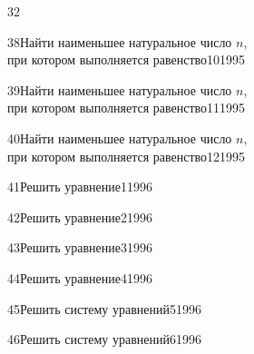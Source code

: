 \begin{TrigSourcePage}{32}
\begin{TrigExercise}{38}{Найти наименьшее натуральное число $n$,\\при котором выполняется равенство}{10}{1995}
\end{TrigExercise}
\begin{TrigExercise}{39}{Найти наименьшее натуральное число $n$,\\при котором выполняется равенство}{11}{1995}
\end{TrigExercise}
\begin{TrigExercise}{40}{Найти наименьшее натуральное число $n$,\\при котором выполняется равенство}{12}{1995}
\end{TrigExercise}
\begin{TrigExercise}{41}{Решить уравнение}{1}{1996}
\end{TrigExercise}
\begin{TrigExercise}{42}{Решить уравнение}{2}{1996}
\end{TrigExercise}
\begin{TrigExercise}{43}{Решить уравнение}{3}{1996}
\end{TrigExercise}
\begin{TrigExercise}{44}{Решить уравнение}{4}{1996}
\end{TrigExercise}
\begin{TrigExercise}{45}{Решить систему уравнений}{5}{1996}
\end{TrigExercise}
\begin{TrigExercise}{46}{Решить систему уравнений}{6}{1996}

\end{TrigExercise}
\end{TrigSourcePage}
